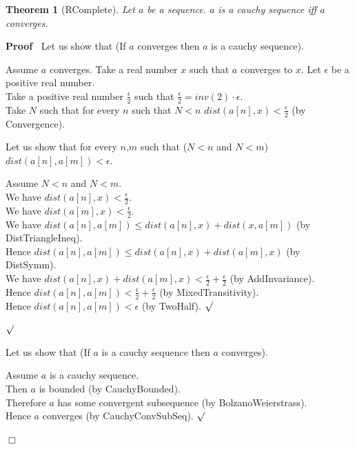 \documentclass{article}
\newenvironment{forthel}{\begin{leftbar}}{\end{leftbar}}
\newenvironment{proof}{\noindent\textbf{Proof\ }}{\hspace*{\fill}$\Box$\medskip}
\newenvironment{subproof}{\begin{list}{}{}
		\item[\text{Proof}]}{\hfill $\surd$ \end{list}}
\newtheorem{theorem}{Theorem}
\newcommand{\halfeps}{\frac{\epsilon}{2}}
\begin{document}
\begin{forthel}
	\begin{theorem}[RComplete]
		Let $a$ be a sequence. $a$ is a cauchy sequence iff $a$ converges.
	\end{theorem}
	
	\begin{proof}
		Let us show that (If $a$ converges then $a$ is a cauchy sequence).
		\begin{subproof}
			Assume $a$ converges.
			Take a real number $x$ such that $a$ converges \linebreak to $x$.
			Let $\epsilon$ be a positive real number.\\
			Take a positive real number $\halfeps$ such that $\halfeps = inv(2) \cdot \epsilon$.\\
			Take $N$ such that for every $n$ such that $N < n$ $dist(a[n],x) < \halfeps$ (by Convergence).
			
			Let us show that for every $n$,$m$ such that ($N < n$ and $N < m$) $dist(a[n],a[m]) < \epsilon$.
			\begin{subproof}
				Assume $N < n$ and $N < m$.\\
				We have $dist(a[n],x) < \halfeps$.\\
				We have $dist(a[m],x) < \halfeps$.\\
				We have $dist(a[n],a[m]) \leq dist(a[n],x) + dist(x,a[m])$ (by DistTriangleIneq).\\
				Hence $dist(a[n],a[m]) \leq dist(a[n],x) + dist(a[m],x)$ (by DistSymm).\\
				We have $dist(a[n],x) + dist(a[m],x) < \halfeps + \halfeps$ (by AddInvariance).\\
				Hence $dist(a[n],a[m]) < \halfeps + \halfeps$ (by MixedTransitivity).\\
				Hence $dist(a[n],a[m]) < \epsilon$ (by TwoHalf).
			\end{subproof}
		\end{subproof}
		
		\noindent Let us show that (If $a$ is a cauchy sequence then $a$ converges).
		\begin{subproof}
			Assume $a$ is a cauchy sequence.\\
			Then $a$ is bounded (by CauchyBounded).\\
			Therefore $a$ has some convergent subsequence (by BolzanoWeierstrass).\\
			Hence $a$ converges (by CauchyConvSubSeq).
		\end{subproof}
	\end{proof}
	

\end{forthel}
\end{document}
